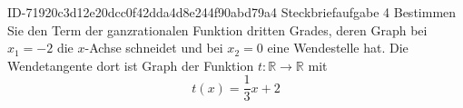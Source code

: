 \begin{exercise}
      {ID-71920c3d12e20dcc0f42dda4d8e244f90abd79a4}
      {Steckbriefaufgabe 4}
  \ifproblem\problem
    Bestimmen Sie den Term der ganzrationalen Funktion dritten Grades, deren
    Graph bei $x_1=\num{-2}$ die $x$-Achse schneidet und bei $x_2=\num{0}$
    eine Wendestelle hat. Die Wendetangente dort ist Graph der Funktion
    $t:\mathbb{R}\to\mathbb{R}$ mit
    \begin{equation*}
      t(x)=\frac{1}{3}x+2
    \end{equation*}
  \fi
\end{exercise}
